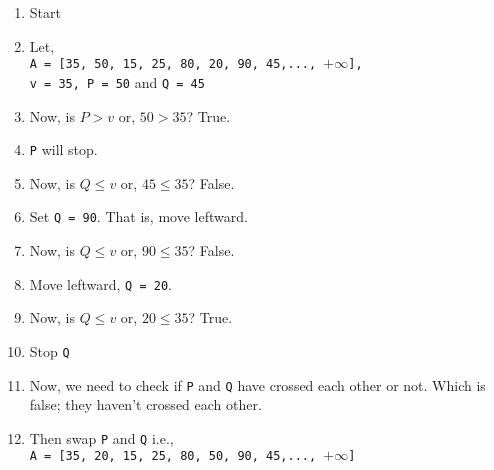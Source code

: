 \documentclass[a4paper,12pt]{article}
\theoremstyle{definition}
\begin{document}
    \begin{enumerate}
        \item Start
        \item Let,\\ \texttt{A = [35, 50, 15, 25, 80, 20, 90, 45,..., $+\infty$],\\ v = 35, P = 50} and \texttt{Q = 45}
        \item Now, is $P > v$ or, $50 > 35$? True.
        \item \texttt{P} will stop.
        \item Now, is $Q \leq v$ or, $45 \leq 35$? False.
        \item Set \texttt{Q = 90}. That is, move leftward.
        \item Now, is $Q \leq v$ or, $90 \leq 35$? False.
        \item Move leftward, \texttt{Q = 20}.
        \item Now, is $Q \leq v$ or, $20 \leq 35$? True.
        \item Stop \texttt{Q}
        \item Now, we need to check if \texttt{P} and \texttt{Q} have crossed each other or not.
        Which is false; they haven't crossed each other.
        \item Then swap \texttt{P} and \texttt{Q} i.e.,\\ \texttt{A = [35, 20, 15, 25, 80, 50, 90, 45,..., $+\infty$]}


\end{enumerate}
\end{document}
